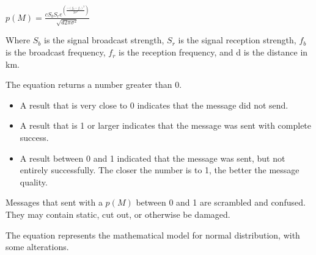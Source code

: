 \documentclass{article}
\begin{document}
		\bigskip
		\centering

		$p(M) = \frac{c S_{b} S_{r} e^{(\frac{-(f_{b}-f_{r})^2}{2\sigma^{2}})}}{\sqrt{d2\pi\sigma^{2}}}$

		\flushleft
		\bigskip

		Where $S_{b}$ is the signal broadcast strength, $S_{r}$ is the signal reception strength, $f_{b}$ is the broadcast frequency, $f_{r}$ is the reception frequency, and d is the distance in km.

		\bigskip

		The equation returns a number greater than 0.

		\begin{itemize}
			\item A result that is very close to 0 indicates that the message did not send.
			\item A result that is 1 or larger indicates that the message was sent with complete success.
			\item A result between 0 and 1 indicated that the message was sent, but not entirely successfully. The closer the number is to 1, the better the message quality.
		\end{itemize}

		Messages that sent with a $p(M)$ between 0 and 1 are scrambled and confused. They may contain static, cut out, or otherwise be damaged.

		\bigskip

		The equation represents the mathematical model for normal distribution, with some alterations.



\end{document}
